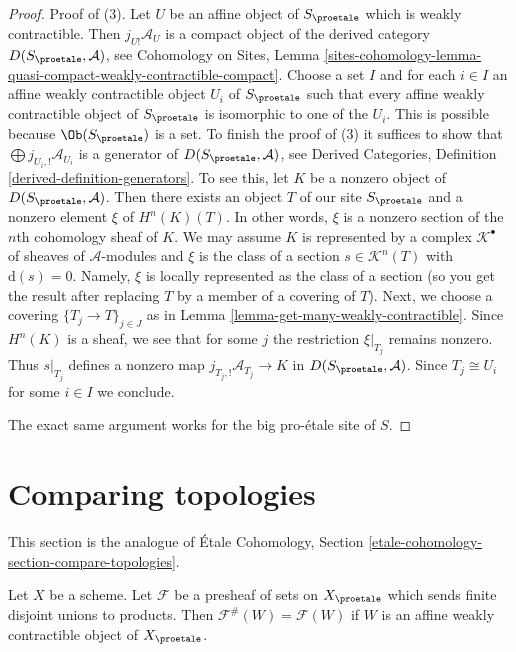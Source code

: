 \begin{proof}
Proof of (3). Let $U$ be an affine object of $S_\proetale$ which is
weakly contractible. Then $j_{U!}\mathcal{A}_U$ is a compact object
of the derived category $D(S_\proetale, \mathcal{A})$, see
Cohomology on Sites, Lemma
\ref{sites-cohomology-lemma-quasi-compact-weakly-contractible-compact}.
Choose a set $I$ and for each $i \in I$ an affine weakly contractible
object $U_i$ of $S_\proetale$ such that every affine weakly contractible
object of $S_\proetale$ is isomorphic to one of the $U_i$. This is possible
because $\Ob(S_\proetale)$ is a set. To finish the proof of (3) it suffices
to show that $\bigoplus j_{U_i, !}\mathcal{A}_{U_i}$ is a generator
of $D(S_\proetale, \mathcal{A})$, see
Derived Categories, Definition \ref{derived-definition-generators}.
To see this, let $K$ be a nonzero object
of $D(S_\proetale, \mathcal{A})$. Then there exists an object $T$
of our site $S_\proetale$ and a nonzero element $\xi$ of $H^n(K)(T)$.
In other words, $\xi$ is a nonzero section of the $n$th cohomology
sheaf of $K$.
We may assume $K$ is represented by a complex $\mathcal{K}^\bullet$
of sheaves of $\mathcal{A}$-modules and $\xi$ is the class of a
section $s \in \mathcal{K}^n(T)$ with $\text{d}(s) = 0$.
Namely, $\xi$ is locally represented as the class of a section
(so you get the result after replacing $T$ by a member of a covering of $T$).
Next, we choose a covering $\{T_j \to T\}_{j \in J}$
as in Lemma \ref{lemma-get-many-weakly-contractible}.
Since $H^n(K)$ is a sheaf, we see that for some $j$ the restriction
$\xi|_{T_j}$ remains nonzero. Thus $s|_{T_j}$ defines a nonzero map
$j_{T_j, !}\mathcal{A}_{T_j} \to K$ in $D(S_\proetale, \mathcal{A})$.
Since $T_j \cong U_i$ for some $i \in I$ we conclude.

\medskip\noindent
The exact same argument works for the big pro-\'etale site of $S$.
\end{proof}







\section{Comparing topologies}
\label{section-compare-topologies}

\noindent
This section is the analogue of
\'Etale Cohomology, Section \ref{etale-cohomology-section-compare-topologies}.

\begin{lemma}
\label{lemma-presheaf-value-weakly-contractible}
Let $X$ be a scheme. Let $\mathcal{F}$ be a presheaf of sets on $X_\proetale$
which sends finite disjoint unions to products. Then
$\mathcal{F}^\#(W) = \mathcal{F}(W)$ if $W$ is an affine weakly contractible
object of $X_\proetale$.
\end{lemma}

